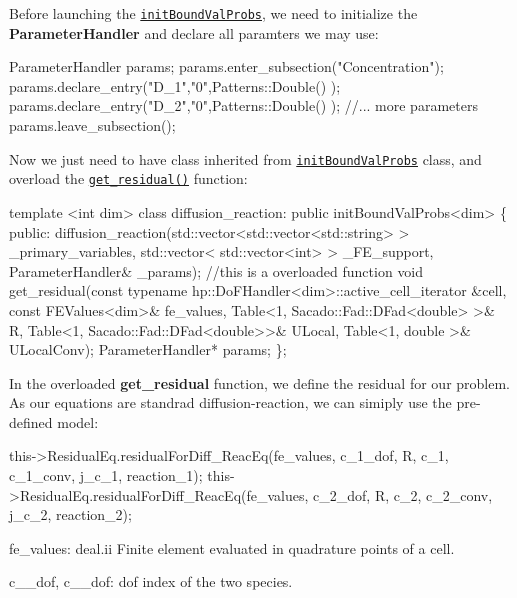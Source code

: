  Before launching the \href{../html/classinit_bound_val_probs.html}{\tt init\-Bound\-Val\-Probs}, we need to initialize the {\bfseries Parameter\-Handler} and declare all paramters we may use\-: 
\begin{DoxyCode}
ParameterHandler params;
params.enter\_subsection(\textcolor{stringliteral}{"Concentration"});   
params.declare\_entry(\textcolor{stringliteral}{"D\_1"},\textcolor{stringliteral}{"0"},Patterns::Double() );
params.declare\_entry(\textcolor{stringliteral}{"D\_2"},\textcolor{stringliteral}{"0"},Patterns::Double() );
\textcolor{comment}{//... more parameters }
params.leave\_subsection();  
\end{DoxyCode}
 Now we just need to have class inherited from \href{../html/classinit_bound_val_probs.html}{\tt init\-Bound\-Val\-Probs} class, and overload the \href{../html/classinit_bound_val_probs.html#ac8f2c3e2a1040c70b709900dc3dfdaea}{\tt get\-\_\-residual()} function\-: 
\begin{DoxyCode}
\textcolor{keyword}{template} <\textcolor{keywordtype}{int} dim>
\textcolor{keyword}{class }diffusion\_reaction: \textcolor{keyword}{public} initBoundValProbs<dim>
\{
    \textcolor{keyword}{public}:
        diffusion\_reaction(std::vector<std::vector<std::string> > \_primary\_variables, std::vector<
      std::vector<int> > \_FE\_support, ParameterHandler& \_params);
        \textcolor{comment}{//this is a overloaded function }
        \textcolor{keywordtype}{void} get\_residual(\textcolor{keyword}{const} \textcolor{keyword}{typename} hp::DoFHandler<dim>::active\_cell\_iterator &cell, \textcolor{keyword}{const} 
      FEValues<dim>& fe\_values, Table<1, Sacado::Fad::DFad<double> >& R, Table<1, Sacado::Fad::DFad<double>>& ULocal, 
      Table<1, double >& ULocalConv);
        ParameterHandler* params;       
\};
\end{DoxyCode}
 In the overloaded {\bfseries get\-\_\-residual} function, we define the residual for our problem. As our equations are standrad diffusion-\/reaction, we can simiply use the pre-\/defined model\-: 
\begin{DoxyCode}
this->ResidualEq.residualForDiff_ReacEq(fe\_values, c\_1\_dof, R, c\_1, c\_1\_conv, j\_c\_1, reaction\_1);
this->ResidualEq.residualForDiff_ReacEq(fe\_values, c\_2\_dof, R, c\_2, c\_2\_conv, j\_c\_2, reaction\_2);
\end{DoxyCode}
 fe\-\_\-values\-: deal.\-ii Finite element evaluated in quadrature points of a cell.

c\-\_\-\_\-dof, c\-\_\-\_\-dof\-: dof index of the two species.

